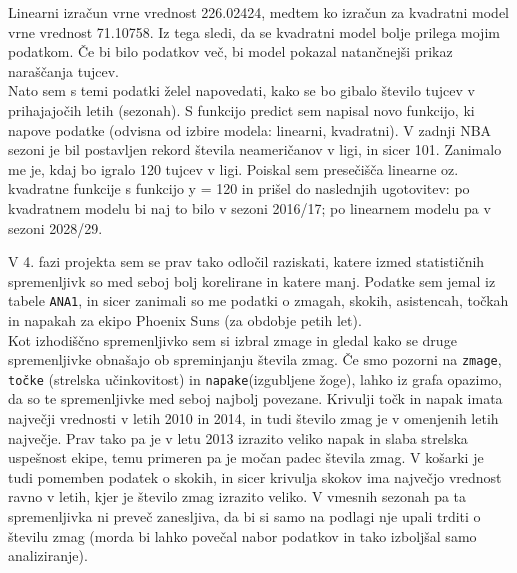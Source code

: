 \documentclass[11pt,a4paper]{article}
\begin{document}
Linearni izračun vrne vrednost 226.02424, medtem ko izračun za kvadratni model vrne vrednost 71.10758. Iz tega sledi, da se kvadratni model bolje prilega mojim podatkom. Če bi bilo podatkov več, bi model pokazal natančnejši prikaz naraščanja tujcev.\\



Nato sem s temi podatki želel napovedati, kako se bo gibalo število tujcev v prihajajočih letih (sezonah). S funkcijo predict sem napisal novo funkcijo, ki napove podatke (odvisna od izbire modela: linearni, kvadratni). V zadnji NBA sezoni je bil postavljen rekord števila neameričanov v ligi, in sicer 101. Zanimalo me je, kdaj bo igralo 120 tujcev v ligi. Poiskal sem presečišča linearne oz. kvadratne funkcije s funkcijo y = 120 in prišel do naslednjih ugotovitev: po kvadratnem modelu bi naj to bilo v sezoni 2016/17;
po linearnem modelu pa v sezoni 2028/29.\\


\newpage
V 4. fazi projekta sem se prav tako odločil raziskati, katere izmed statističnih spremenljivk so med seboj bolj korelirane in katere manj. Podatke sem jemal iz tabele \verb|ANA1|, in sicer zanimali so me podatki o zmagah, skokih, asistencah, točkah in napakah za ekipo Phoenix Suns (za obdobje petih let).\\

\newpage
Kot izhodiščno spremenljivko sem si izbral zmage in gledal kako se druge spremenljivke obnašajo ob spreminjanju števila zmag. Če smo pozorni na \verb|zmage|, \verb|točke| (strelska učinkovitost) in \verb|napake|(izgubljene žoge), lahko iz grafa opazimo, da so te spremenljivke med seboj najbolj povezane. Krivulji točk in napak imata največji vrednosti v letih 2010 in 2014, in tudi število zmag je v omenjenih letih največje. Prav tako pa je v letu 2013 izrazito veliko napak in slaba strelska uspešnost ekipe, temu primeren pa je močan padec števila zmag. V košarki je tudi pomemben podatek o skokih, in sicer krivulja skokov ima največjo vrednost ravno v letih, kjer je število zmag izrazito veliko. V vmesnih sezonah pa ta spremenljivka ni preveč zanesljiva, da bi si samo na podlagi nje upali trditi o številu zmag (morda bi lahko povečal nabor podatkov in tako izboljšal samo analiziranje).\\
\end{document}

